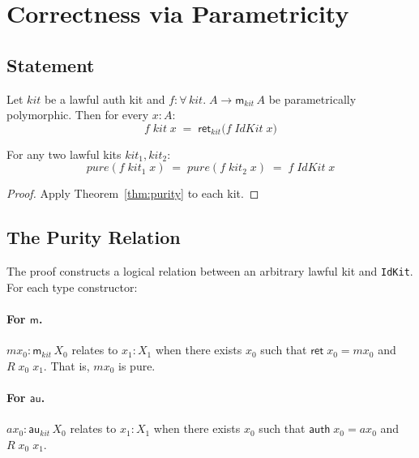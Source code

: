 \documentclass[acmsmall,screen,review,anonymous]{acmart}
\begin{document}
\section{Correctness via Parametricity}\label{sec:free-theorem}

\subsection{Statement}

\begin{theorem}[Purity]\label{thm:purity}
Let $\mathit{kit}$ be a lawful auth kit and
$f : \forall\,\mathit{kit}.\;A \to \mathsf{m}_{\mathit{kit}}\,A$
be parametrically polymorphic.  Then for every $x : A$:
\[
  f\;\mathit{kit}\;x \;=\;
    \mathsf{ret}_{\mathit{kit}}\!\bigl(f\;\mathit{IdKit}\;x\bigr)
\]
\end{theorem}

\begin{corollary}[Agreement]\label{cor:agreement}
For any two lawful kits $\mathit{kit}_1, \mathit{kit}_2$:
\[
  \mathit{pure}(f\;\mathit{kit}_1\;x) \;=\;
  \mathit{pure}(f\;\mathit{kit}_2\;x) \;=\;
  f\;\mathit{IdKit}\;x
\]
\end{corollary}

\begin{proof}
Apply Theorem~\ref{thm:purity} to each kit.
\end{proof}

\subsection{The Purity Relation}\label{sec:purity-rel}

The proof constructs a logical relation between an arbitrary lawful
kit and \texttt{IdKit}.  For each type constructor:

\paragraph{For $\mathsf{m}$.}
$\mathit{mx}_0 : \mathsf{m}_{\mathit{kit}}\,X_0$ relates to
$x_1 : X_1$ when there exists $x_0$ such that
$\mathsf{ret}\;x_0 = \mathit{mx}_0$ and $R\;x_0\;x_1$.
That is, $\mathit{mx}_0$ is pure.

\paragraph{For $\mathsf{au}$.}
$\mathit{ax}_0 : \mathsf{au}_{\mathit{kit}}\,X_0$ relates to
$x_1 : X_1$ when there exists $x_0$ such that
$\mathsf{auth}\;x_0 = \mathit{ax}_0$ and $R\;x_0\;x_1$.
\end{document}
